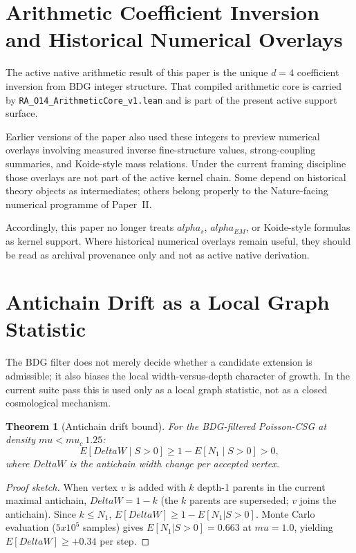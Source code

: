 \documentclass[11pt]{article}
\def\Delta{Delta}%
\def\mu{mu}%
\def\alpha{alpha}%
\def\mathrm#1{#1}%
\def\mathbb#1{#1}%
\def\times{x}%
\def\approx{~}%
\newtheorem{theorem}{Theorem}
\begin{document}
\section{Arithmetic Coefficient Inversion and Historical Numerical Overlays}
\label{sec:couplings}

The active native arithmetic result of this paper is the unique $d=4$ coefficient inversion from BDG integer structure. That compiled arithmetic core is carried by \texttt{RA\_O14\_ArithmeticCore\_v1.lean} and is part of the present active support surface.

Earlier versions of the paper also used these integers to preview numerical overlays involving measured inverse fine-structure values, strong-coupling summaries, and Koide-style mass relations. Under the current framing discipline those overlays are not part of the active kernel chain. Some depend on historical theory objects as intermediates; others belong properly to the Nature-facing numerical programme of Paper~II.

Accordingly, this paper no longer treats $\alpha_s$, $\alpha_{\mathrm{EM}}$, or Koide-style formulas as kernel support. Where historical numerical overlays remain useful, they should be read as archival provenance only and not as active native derivation.

\section{Antichain Drift as a Local Graph Statistic}
\label{sec:drift}

The BDG filter does not merely decide whether a candidate extension is admissible; it also biases the local width-versus-depth character of growth. In the current suite pass this is used only as a local graph statistic, not as a closed cosmological mechanism.

\begin{theorem}[Antichain drift bound]
\label{thm:drift}
For the BDG-filtered Poisson-CSG at density $\mu<\mu_c\approx 1.25$:
\begin{equation}
\mathbb{E}[\Delta W\mid S>0] \ge 1-\mathbb{E}[N_1\mid S>0] > 0,
\end{equation}
where $\Delta W$ is the antichain width change per accepted vertex.
\end{theorem}
\begin{proof}[Proof sketch]
When vertex $v$ is added with $k$ depth-1 parents in the current maximal antichain, $\Delta W=1-k$ (the $k$ parents are superseded; $v$ joins the antichain). Since $k\le N_1$, $\mathbb{E}[\Delta W]\ge 1-\mathbb{E}[N_1|S>0]$. Monte Carlo evaluation ($5\times 10^5$ samples) gives $\mathbb{E}[N_1|S>0]=0.663$ at $\mu=1.0$, yielding $\mathbb{E}[\Delta W]\ge +0.34$ per step.
\end{proof}
\end{document}
